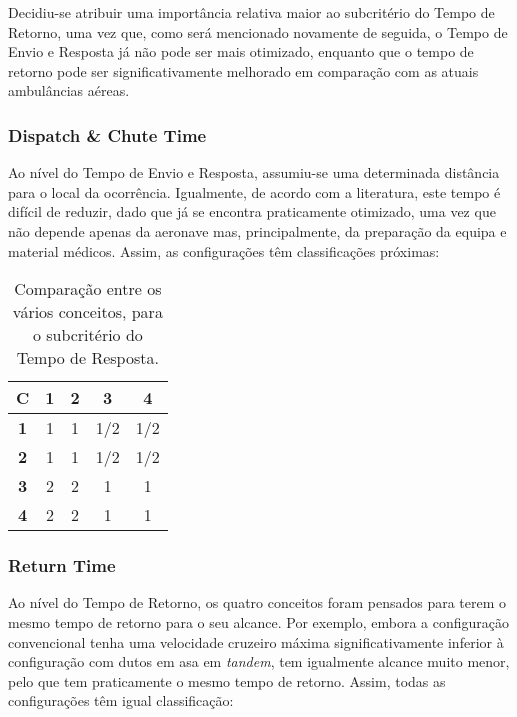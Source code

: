 Decidiu-se atribuir uma importância relativa maior ao subcritério do Tempo de Retorno, uma vez que, como será mencionado novamente de seguida, o Tempo de Envio e Resposta já não pode ser mais otimizado, enquanto que o tempo de retorno pode ser significativamente melhorado em comparação com as atuais ambulâncias aéreas.



\subsubsection{Dispatch \& Chute Time}

Ao nível do Tempo de Envio e Resposta, assumiu-se uma determinada distância para o local da ocorrência. Igualmente, de acordo com a literatura, este tempo é difícil de reduzir, dado que já se encontra praticamente otimizado, uma vez que não depende apenas da aeronave mas, principalmente, da preparação da equipa e material médicos. Assim, as configurações têm classificações próximas:

\begin{table}[H]
\begin{center}
\caption{Comparação entre os vários conceitos, para o subcritério do Tempo de Resposta.}
\begin{tabular}{ |c|c c c c| }
 \hline
 \textbf{C} & \textbf{1} & \textbf{2} & \textbf{3} & \textbf{4}  \\
\hline
 \textbf{1} & 1 & 1 & 1/2 & 1/2 \\
 \textbf{2} & 1 & 1 & 1/2 & 1/2  \\
 \textbf{3} & 2 & 2 & 1 & 1  \\
 \textbf{4} & 2 & 2 & 1 & 1  \\
\hline
\end{tabular}
\end{center}
\end{table}




\subsubsection{Return Time}


Ao nível do Tempo de Retorno, os quatro conceitos foram pensados para terem o mesmo tempo de retorno para o seu alcance. Por exemplo, embora a configuração convencional tenha uma velocidade cruzeiro máxima significativamente inferior à configuração com dutos em asa em \textit{tandem}, tem igualmente alcance muito menor, pelo que tem praticamente o mesmo tempo de retorno. Assim, todas as configurações têm igual classificação:


